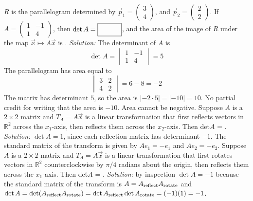 \begin{parts}
        $R$ is the parallelogram determined by $\vec p_1 = \begin{pmatrix}3\\4 \end{pmatrix}$, and $\vec p_2 = \begin{pmatrix} 2\\2\end{pmatrix}$.  If $A = \begin{pmatrix} 1&-1\\1&4\end{pmatrix}$, then $\det A = \framebox{\strut\hspace{1cm}}$, and the area of the image of $R$ under the map $ \vec x\mapsto A\vec x$ is \framebox{\strut\hspace{1cm}}.
        \ifnum {} {\color{DarkBlue} \textit{Solution:} The determinant of $A$ is $$\det A = \begin{vmatrix} 1&-1\\1&4 \end{vmatrix} = 5$$ The parallelogram has area equal to $$\begin{vmatrix} 3&2\\4&2 \end{vmatrix} = 6-8 = -2$$ The matrix has determinant $5$, so the area is $| -2 \cdot 5| = |-10| = 10$. No partial credit for writing that the area is $-10$. Area cannot be negative. } \fi    
    \fi 
    \ifnum {}
    Suppose $A$ is a $2\times 2$ matrix and $T_A = A\vec x$ is a linear transformation that first reflects vectors in $\mathbb R^2$ across the $x_1$-axis, then reflects them across the $x_2$-axis. Then det$A$ = \framebox{\strut\hspace{1cm}}.
        \ifnum {} {\color{DarkBlue} \textit{Solution:}  $\det A = 1$, since each reflection matrix has determinant $-1$. The standard matrix of the transform is given by $ A e_1 = -e_1 $ and $A e_2 = -e_2$.}    
    \fi
    \fi    
    \ifnum {}
         Suppose $A$ is a $2\times 2$ matrix and $T_A = A\vec x$ is a linear transformation that first rotates vectors in $\mathbb R^2$ counterclockwise by $\pi/4$ radians about the origin, then reflects them across the $x_1$-axis. Then det$A$ = \framebox{\strut\hspace{1cm}}.
        \ifnum {} {\color{DarkBlue} \textit{Solution:} by inspection $\det A = -1$ because the standard matrix of the transform is $A = A_{\textup{reflect}}A_{\textup{rotate}}$ and $\det A = \det (A_{\textup{reflect}}A_{\textup{rotate}}) = \det A_{\textup{reflect}} \det A_{\textup{rotate}} = (-1)(1) = -1$.}

\end{parts}
